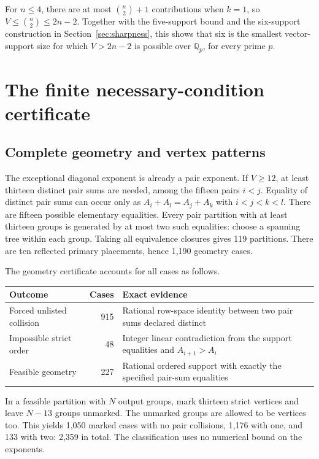 \documentclass[11pt]{article}
\theoremstyle{remark}\newtheorem{remark}[theorem]{Remark}
\newcommand{\Q}{\mathbb Q}
\begin{document}
For $n\le4$, there are at most $\binom n2+1$ contributions when $k=1$,
so $V\le\binom n2\le2n-2$. Together with the five-support bound and
the six-support construction in Section~\ref{sec:sharpness}, this shows
that six is the smallest vector-support size for which $V>2n-2$ is
possible over $\Q_p$, for every prime $p$.

\section{The finite necessary-condition certificate}

\subsection{Complete geometry and vertex patterns}

The exceptional diagonal exponent is already a pair exponent. If
$V\ge12$, at least thirteen distinct pair sums are needed, among the
fifteen pairs $i<j$. Equality of distinct pair sums can occur only as
$A_i+A_l=A_j+A_k$ with $i<j<k<l$. There are fifteen possible elementary
equalities. Every pair partition with at least thirteen groups is
generated by at most two such equalities: choose a spanning tree within
each group. Taking all equivalence closures gives 119 partitions.
There are ten reflected primary placements, hence 1,190 geometry cases.

The geometry certificate accounts for all cases as follows.
\begin{center}
\begin{tabular}{lrp{7.1cm}}
\toprule
Outcome&Cases&Exact evidence\\
\midrule
Forced unlisted collision&915&Rational row-space identity between two
pair sums declared distinct\\
Impossible strict order&48&Integer linear contradiction from the
support equalities and $A_{i+1}>A_i$\\
Feasible geometry&227&Rational ordered support with exactly the
specified pair-sum equalities\\
\bottomrule
\end{tabular}
\end{center}
In a feasible partition with $N$ output groups, mark thirteen strict
vertices and leave $N-13$ groups unmarked. The unmarked groups are
allowed to be vertices too. This yields 1,050 marked cases with no
pair collisions, 1,176 with one, and 133 with two: 2,359 in total.
The classification uses no numerical bound on the exponents.
\end{document}
